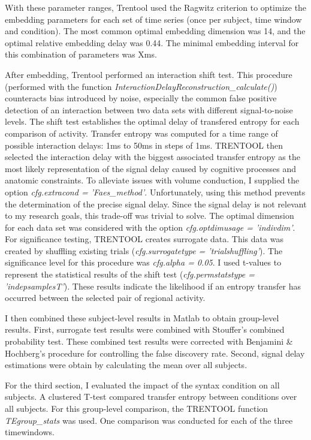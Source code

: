With these parameter ranges, Trentool used the Ragwitz criterion to optimize the embedding parameters for each set of time series (once per subject, time window and condition).
The most common optimal embedding dimension was 14, and the optimal relative embedding delay was 0.44.
The minimal embedding interval for this combination of parameters was Xms.

After embedding, Trentool performed an interaction shift test.
This procedure (performed with the function \emph{InteractionDelayReconstruction\_calculate()}) counteracts bias introduced by noise, especially the common false positive detection of an interaction between two data sets with different signal-to-noise levels.
The shift test establishes the optimal delay of transfered entropy for each comparison of activity.
Transfer entropy was computed for a time range of possible interaction delays: 1ms to 50ms in steps of 1ms.
TRENTOOL then selected the interaction delay with the biggest associated transfer entropy as the most likely representation of the signal delay caused by cognitive processes and anatomic constraints.
To alleviate issues with volume conduction, I supplied the option \emph{cfg.extracond = 'Faes\_method'}.
Unfortunately, using this method prevents the determination of the precise signal delay.
Since the signal delay is not relevant to my research goals, this trade-off was trivial to solve.
The optimal dimension for each data set was considered with the option \emph{cfg.optdimusage = 'indivdim'}.
For significance testing, TRENTOOL creates surrogate data.
This data was created by shuffling existing trials (\emph{cfg.surrogatetype = 'trialshuffling'}).
The significance level for this procedure was \emph{cfg.alpha = 0.05}.
I used t-values to represent the statistical results of the shift test (\emph{cfg.permstatstype = 'indepsamplesT'}).
These results indicate the likelihood if an entropy transfer has occurred between the selected pair of regional activity.

I then combined these subject-level results in Matlab to obtain group-level results.
First, surrogate test results were combined with Stouffer's combined probability test.
These combined test results were corrected with Benjamini & Hochberg's procedure for controlling the false discovery rate.
Second, signal delay estimations were obtain by calculating the mean over all subjects.


For the third section, I evaluated the impact of the syntax condition on all subjects.
A clustered T-test compared transfer entropy between conditions over all subjects.
For this group-level comparison, the TRENTOOL function \emph{TEgroup\_stats} was used.
One comparison was conducted for each of the three timewindows.